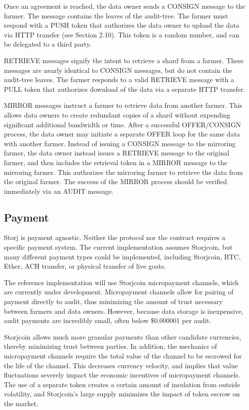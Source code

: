 \documentclass[a4paper,10pt]{article}
\begin{document}
Once an agreement is reached, the data owner sends a CONSIGN message to the farmer. The message contains the leaves of the audit-tree. The farmer must respond with a PUSH token that authorizes the data owner to upload the data via HTTP transfer (see Section 2.10). This token is a random number, and can be delegated to a third party.

RETRIEVE messages signify the intent to retrieve a shard from a farmer. These messages are nearly identical to CONSIGN messages, but do not contain the audit-tree leaves. The farmer responds to a valid RETRIEVE message with a PULL token that authorizes download of the data via a separate HTTP transfer.

MIRROR messages instruct a farmer to retrieve data from another farmer. This allows data owners to create redundant copies of a shard without expending significant additional bandwidth or time. After a successful OFFER/CONSIGN process, the data owner may initiate a separate OFFER loop for the same data with another farmer. Instead of issuing a CONSIGN message to the mirroring farmer, the data owner instead issues a RETRIEVE message to the original farmer, and then includes the retrieval token in a MIRROR message to the mirroring farmer. This authorizes the mirroring farmer to retrieve the data from the original farmer. The success of the MIRROR process should be verified immediately via an AUDIT message.

\subsection{Payment}
Storj is payment agnostic. Neither the protocol nor the contract requires a specific payment system. The current implementation assumes Storjcoin, but many different payment types could be implemented, including Storjcoin, BTC, Ether, ACH transfer, or physical transfer of live goats.

The reference implementation will use Storjcoin micropayment channels, which are currently under development. Micropayment channels allow for pairing of payment directly to audit, thus minimizing the amount of trust necessary between farmers and data owners. However, because data storage is inexpensive, audit payments are incredibly small, often below \$0.000001 per audit.

Storjcoin allows much more granular payments than other candidate currencies, thereby minimizing trust between parties. In addition, the mechanics of micropayment channels require the total value of the channel to be escrowed for the life of the channel. This decreases currency velocity, and implies that value fluctuations severely impact the economic incentives of micropayment channels. The use of a separate token creates a certain amount of insulation from outside volatility, and Storjcoin's large supply minimizes the impact of token escrow on the market.
\end{document}
